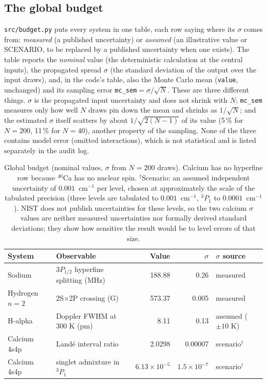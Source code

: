 \subsection*{The global budget}
\texttt{src/budget.py} puts every system in one table, each row saying where its $\sigma$ comes from: \emph{measured} (a published uncertainty) or \emph{assumed} (an illustrative value or SCENARIO, to be replaced by a published uncertainty when one exists).
The table reports the \emph{nominal} value (the deterministic calculation at the central inputs), the propagated spread $\sigma$ (the standard deviation of the output over the input draws), and, in the code's table, also the Monte Carlo mean (\texttt{value}, unchanged) and its sampling error \texttt{mc\_sem}$=\sigma/\sqrt N$. These are three different things. $\sigma$ is the propagated input uncertainty and does not shrink with $N$; \texttt{mc\_sem} measures only how well $N$ draws pin down the mean and shrinks as $1/\sqrt N$; and the estimated $\sigma$ itself scatters by about $1/\sqrt{2(N-1)}$ of its value (5\,\% for $N=200$, 11\,\% for $N=40$), another property of the sampling. None of the three contains model error (omitted interactions), which is not statistical and is listed separately in the audit log.
\begin{table}[h]
\centering\small
\begin{tabular}{llrrl}
\toprule
System & Observable & Value & $\sigma$ & $\sigma$ source\\
\midrule
Sodium & $3P_{1/2}$ hyperfine splitting (MHz) & 188.88 & 0.26 & measured\\
Hydrogen $n=2$ & 2S$\times$2P crossing (G) & 573.37 & 0.005 & measured\\
H-alpha & Doppler FWHM at 300 K (pm) & 8.11 & 0.13 & assumed ($\pm10$ K)\\
Calcium 4s4p & Land\'e interval ratio & 2.0298 & 0.00007 & scenario$^{\dagger}$\\
Calcium 4s4p & singlet admixture in $^3P_1$ & $6.13\times10^{-5}$ & $1.5\times10^{-7}$ & scenario$^{\dagger}$\\
\bottomrule
\end{tabular}
\caption{Global budget (nominal values, $\sigma$ from $N=200$ draws). Calcium has no hyperfine row because $^{40}$Ca has no nuclear spin. $^{\dagger}$Scenario: an assumed independent uncertainty of $0.001$~cm$^{-1}$ per level, chosen at approximately the scale of the tabulated precision (three levels are tabulated to $0.001$~cm$^{-1}$, $^3P_1$ to $0.0001$~cm$^{-1}$). NIST does not publish uncertainties for these levels, so the two calcium $\sigma$ values are neither measured uncertainties nor formally derived standard deviations; they show how sensitive the result would be to level errors of that size.}
\end{table}

